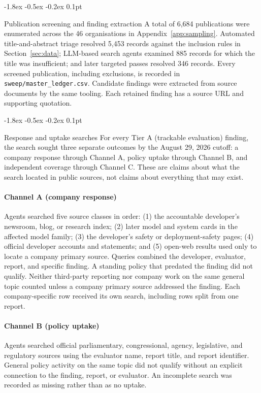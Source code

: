 \documentclass{article}
\makeatletter
\renewcommand{\subsection}{%
  \@startsection{subsection}{2}{\z@}%
                {-1.8ex \@plus -0.5ex \@minus -0.2ex}%
                {0.1pt}%
                {\normalsize\bf\raggedright}%
}
\makeatother
\begin{document}
\subsection{Publication screening and finding extraction}
A total of 6,684 publications were enumerated across the 46 organisations in Appendix~\ref{app:sampling}. Automated title-and-abstract triage resolved 5,453 records against the inclusion rules in Section~\ref{sec:data}; LLM-based search agents examined 885 records for which the title was insufficient; and later targeted passes resolved 346 records. Every screened publication, including exclusions, is recorded in \texttt{sweep/master\_ledger.csv}. Candidate findings were extracted from source documents by the same tooling. Each retained finding has a source URL and supporting quotation.

\subsection{Response and uptake searches}\label{app:response-search}
For every Tier A (trackable evaluation) finding, the search sought three separate outcomes by the August 29, 2026 cutoff: a company response through Channel A, policy uptake through Channel B, and independent coverage through Channel C. These are claims about what the search located in public sources, not claims about everything that may exist.

\paragraph{Channel A (company response)}
Agents searched five source classes in order: (1) the accountable developer's newsroom, blog, or research index; (2) later model and system cards in the affected model family; (3) the developer's safety or deployment-safety pages; (4) official developer accounts and statements; and (5) open-web results used only to locate a company primary source. Queries combined the developer, evaluator, report, and specific finding. A standing policy that predated the finding did not qualify. Neither third-party reporting nor company work on the same general topic counted unless a company primary source addressed the finding. Each company-specific row received its own search, including rows split from one report.

\paragraph{Channel B (policy uptake)}
Agents searched official parliamentary, congressional, agency, legislative, and regulatory sources using the evaluator name, report title, and report identifier. General policy activity on the same topic did not qualify without an explicit connection to the finding, report, or evaluator. An incomplete search was recorded as missing rather than as no uptake.
\end{document}
